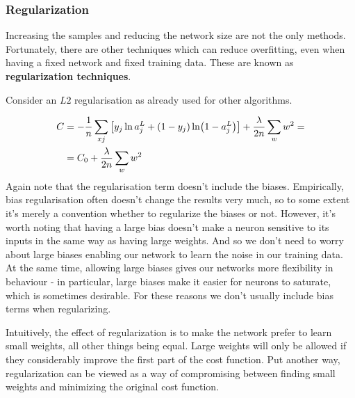 \documentclass[12pt, letterpaper]{article}
\theoremstyle{definition}
\DeclarePairedDelimiter\autobracket{(}{)}
\newcommand{\br}[1]{\autobracket*{#1}}
\let\tb\textbf
\begin{document}
\subsubsection{Regularization}
Increasing the samples and reducing the network size are not the only methods. Fortunately, there are other techniques which can reduce overfitting, even when having a fixed network and fixed training data. These are known as \tb{regularization techniques}.

Consider an $L2$ regularisation as already used for other algorithms.

\begin{equation}
\begin{aligned}
C &= -\frac{1}{n} \sum_{xj} \left[y_j \ln a_j^L +\br{1-y_j} \ln \br{1-a_j^L}\right] + \frac{\lambda}{2n} \sum_w w^2 = \\
&=C_0 +  \frac{\lambda}{2n} \sum_w w^2
\end{aligned}
\end{equation}
Again note that the regularisation term doesn't include the biases. Empirically, bias regularisation often doesn't change the results very much, so to some extent it's merely a convention whether to regularize the biases or not. However, it's worth noting that having a large bias doesn't make a neuron sensitive to its inputs in the same way as having large weights. And so we don't need to worry about large biases enabling our network to learn the noise in our training data. At the same time, allowing large biases gives our networks more flexibility in behaviour - in particular, large biases make it easier for neurons to saturate, which is sometimes desirable. For these reasons we don't usually include bias terms when regularizing.

Intuitively, the effect of regularization is to make the network prefer to learn small weights, all other things being equal. Large weights will only be allowed if they considerably improve the first part of the cost function. Put another way, regularization can be viewed as a way of compromising between finding small weights and minimizing the original cost function.
\end{document}
